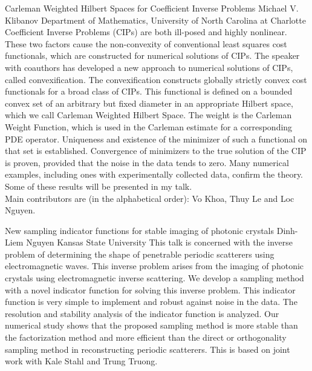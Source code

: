 \begin{addmargin}[2em]{0em}
\vspace{1.5ex}
\abs
{Carleman Weighted Hilbert Spaces for Coefficient Inverse Problems}
{Michael V. Klibanov}
{Department of Mathematics, University of North Carolina at Charlotte}
{Coefficient Inverse Problems (CIPs) are both ill-posed and highly nonlinear. These two factors cause the non-convexity of conventional least squares cost functionals, which are constructed for numerical solutions of CIPs. The speaker with coauthors has developed a new approach to numerical solutions of CIPs, called convexification. The convexification constructs globally strictly convex cost functionals for a broad class of CIPs. This functional is defined on a bounded convex set of an arbitrary but fixed diameter in an appropriate Hilbert space, which we call Carleman Weighted Hilbert Space. The weight is the Carleman Weight Function, which is used in the Carleman estimate for a corresponding PDE operator. Uniqueness and existence of the minimizer of such a functional on that set is established. Convergence of minimizers to the true solution of the CIP is proven, provided that the noise in the data tends to zero. Many numerical examples, including ones with experimentally collected data, confirm the theory.\\
Some of these results will be presented in my talk.\\
Main contributors are (in the alphabetical order): Vo Khoa, Thuy Le and Loc Nguyen.}


\vspace{1.5ex}
\abs
{New sampling indicator functions for stable imaging of photonic crystals}
{Dinh-Liem Nguyen}
{Kansas State University}
{This talk is concerned with the inverse problem of determining the shape of penetrable periodic scatterers using electromagnetic waves. This inverse problem arises from the imaging of photonic crystals using electromagnetic inverse scattering. We develop a sampling method with a novel indicator function for solving this inverse problem. This indicator function is very simple to implement and robust against noise in the data. The resolution and stability analysis of the indicator function is analyzed. Our numerical study shows that the proposed sampling method is more stable than the factorization method and more efficient than the direct or orthogonality sampling method in reconstructing periodic scatterers. This is based on joint work with Kale Stahl and Trung Truong.}



\end{addmargin}
